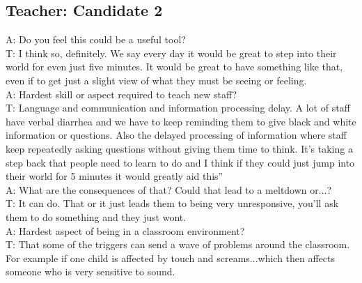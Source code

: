 \subsection{Teacher: Candidate 2}
A: Do you feel this could be a useful tool?\\
T: I think so, definitely. We say every day it would be great to step into their world for even just five minutes. It would be great to have something like that, even if to get just a slight view of what they must be seeing or feeling.\\
A: Hardest skill or aspect required to teach new staff?\\
T: Language and communication and information processing delay. A lot of staff have verbal diarrhea and we have to keep reminding them to give black and white information or questions. Also the delayed processing of information where staff keep repeatedly asking questions without giving them time to think. It’s taking a step back that people need to learn to do and I think if they could just jump into their world for 5 minutes it would greatly aid this”\\
A: What are the consequences of that? Could that lead to a meltdown or...?\\
T: It can do. That or it just leads them to being very unresponsive, you’ll ask them to do something and they just wont.\\
A: Hardest aspect of being in a classroom environment?\\
T: That some of the triggers can send a wave of problems around the classroom. For example if one child is affected by touch and screams...which then affects someone who is very sensitive to sound.\\

